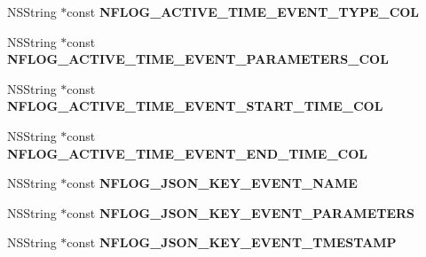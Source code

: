 \begin{DoxyCompactItemize}
\item 
\mbox{\label{interface_n_f_l_o_g_constants_ae9ea341586b71e919aa25b37764ccb06}} 
N\+S\+String $\ast$const {\bfseries N\+F\+L\+O\+G\+\_\+\+A\+C\+T\+I\+V\+E\+\_\+\+T\+I\+M\+E\+\_\+\+E\+V\+E\+N\+T\+\_\+\+T\+Y\+P\+E\+\_\+\+C\+OL}
\item 
\mbox{\label{interface_n_f_l_o_g_constants_ab0972f2c140564c64bc57d1309890392}} 
N\+S\+String $\ast$const {\bfseries N\+F\+L\+O\+G\+\_\+\+A\+C\+T\+I\+V\+E\+\_\+\+T\+I\+M\+E\+\_\+\+E\+V\+E\+N\+T\+\_\+\+P\+A\+R\+A\+M\+E\+T\+E\+R\+S\+\_\+\+C\+OL}
\item 
\mbox{\label{interface_n_f_l_o_g_constants_a5c1405024a5071556162b612e1665f84}} 
N\+S\+String $\ast$const {\bfseries N\+F\+L\+O\+G\+\_\+\+A\+C\+T\+I\+V\+E\+\_\+\+T\+I\+M\+E\+\_\+\+E\+V\+E\+N\+T\+\_\+\+S\+T\+A\+R\+T\+\_\+\+T\+I\+M\+E\+\_\+\+C\+OL}
\item 
\mbox{\label{interface_n_f_l_o_g_constants_aff8def4ff271e59b4c3a365c0de7351b}} 
N\+S\+String $\ast$const {\bfseries N\+F\+L\+O\+G\+\_\+\+A\+C\+T\+I\+V\+E\+\_\+\+T\+I\+M\+E\+\_\+\+E\+V\+E\+N\+T\+\_\+\+E\+N\+D\+\_\+\+T\+I\+M\+E\+\_\+\+C\+OL}
\item 
\mbox{\label{interface_n_f_l_o_g_constants_a50199a3f5fd4f7971e4a29924740210a}} 
N\+S\+String $\ast$const {\bfseries N\+F\+L\+O\+G\+\_\+\+J\+S\+O\+N\+\_\+\+K\+E\+Y\+\_\+\+E\+V\+E\+N\+T\+\_\+\+N\+A\+ME}
\item 
\mbox{\label{interface_n_f_l_o_g_constants_a2ef375433cd9a554dcc7dc743320214a}} 
N\+S\+String $\ast$const {\bfseries N\+F\+L\+O\+G\+\_\+\+J\+S\+O\+N\+\_\+\+K\+E\+Y\+\_\+\+E\+V\+E\+N\+T\+\_\+\+P\+A\+R\+A\+M\+E\+T\+E\+RS}
\item 
\mbox{\label{interface_n_f_l_o_g_constants_a1ed51ed70e78c3308610b5dfa99b69da}} 
N\+S\+String $\ast$const {\bfseries N\+F\+L\+O\+G\+\_\+\+J\+S\+O\+N\+\_\+\+K\+E\+Y\+\_\+\+E\+V\+E\+N\+T\+\_\+\+T\+M\+E\+S\+T\+A\+MP}
\item 
\mbox{\label{interface_n_f_l_o_g_constants_a5ba553f86777047409ca668b0da2a7a8}} 

\end{DoxyCompactItemize}
